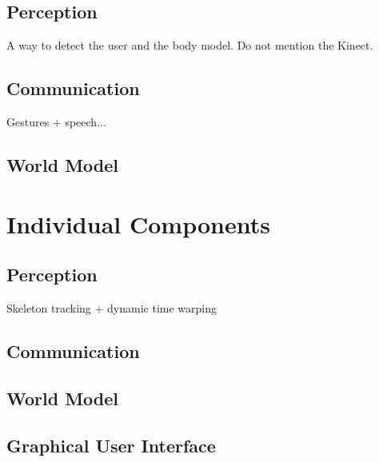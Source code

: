 \documentclass[10pt,a4paper,oneside]{scrartcl}
\begin{document}
\subsection{Perception}
A way to detect the user and the body model. Do not mention the Kinect.

\subsection{Communication}
Gestures + speech...

\subsection{World Model}



\section{Individual Components}

\subsection{Perception}
Skeleton tracking + dynamic time warping

\subsection{Communication}

\subsection{World Model}

\subsection{Graphical User Interface}
\end{document}
